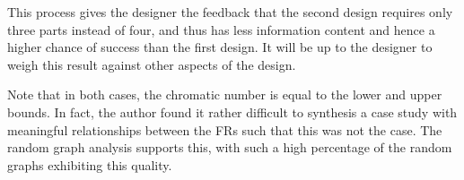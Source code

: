 This process gives the designer the feedback that the second design requires only three parts instead of four, and
thus has less information content and hence a higher chance of success than the first design.  It will be up to the
designer to weigh this result against other aspects of the design.

Note that in both cases, the chromatic number is equal to the lower and upper bounds.  In fact, the author found it
rather difficult to synthesis a case study with meaningful relationships between the FRs such that this was not the
case.  The random graph analysis supports this, with such a high percentage of the random graphs exhibiting this
quality.
